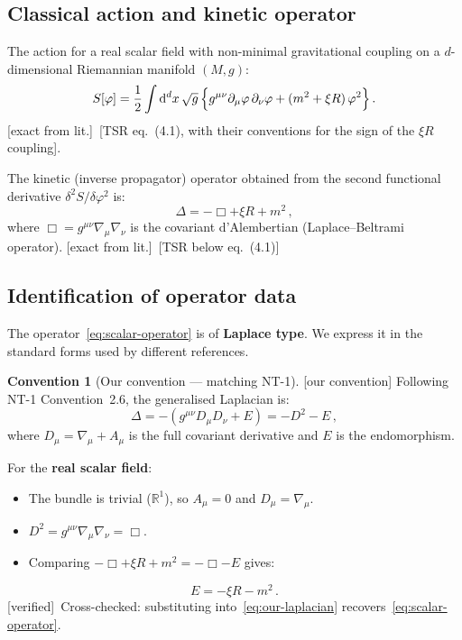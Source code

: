 \documentclass[12pt,a4paper]{article}
\theoremstyle{definition}
\newtheorem{convention}[proposition]{Convention}
\theoremstyle{remark}
\newcommand{\dd}{\mathrm{d}}
\newcommand{\fromlit}[1]{\textcolor{blue!70!black}{\textsf{[#1]}}}
\newcommand{\oursign}{\textcolor{teal!80!black}{\textsf{[our convention]}}}
\newcommand{\exactlit}{\textcolor{blue!60!black}{\textsf{[exact from lit.]}}}
\newcommand{\verified}{\textcolor{green!50!black}{\textsf{[verified]}}}
\begin{document}
\subsection{Classical action and kinetic operator}

The action for a real scalar field with non-minimal gravitational
coupling on a $d$-dimensional Riemannian manifold $(M,g)$:
\begin{equation}
  S[\varphi] = \frac{1}{2}\int \dd^d x\,\sqrt{g}\,\Bigl\{
    g^{\mu\nu}\partial_\mu\varphi\,\partial_\nu\varphi
    + (m^2 + \xi R)\,\varphi^2
  \Bigr\}\,.
  \label{eq:scalar-action}
\end{equation}
\exactlit\ \fromlit{TSR eq.~(4.1), with their conventions for the
sign of the $\xi R$ coupling}.

The kinetic (inverse propagator) operator obtained from the second
functional derivative $\delta^2 S/\delta\varphi^2$ is:
\begin{equation}
  \boxed{
  \Delta = -\Box + \xi R + m^2\,,
  }
  \label{eq:scalar-operator}
\end{equation}
where $\Box = g^{\mu\nu}\nabla_\mu\nabla_\nu$ is the covariant
d'Alembertian (Laplace--Beltrami operator).
\exactlit\ \fromlit{TSR below eq.~(4.1)}

\subsection{Identification of operator data}
\label{sec:operator-identification}

The operator~\eqref{eq:scalar-operator} is of \textbf{Laplace type}.
We express it in the standard forms used by different references.

\begin{convention}[Our convention --- matching NT-1]
\label{conv:ours}
\oursign\;
Following NT-1 Convention~2.6, the generalised Laplacian is:
\begin{equation}
  \Delta = -(g^{\mu\nu}D_\mu D_\nu + E) = -D^2 - E\,,
  \label{eq:our-laplacian}
\end{equation}
where $D_\mu = \nabla_\mu + A_\mu$ is the full covariant derivative
and $E$ is the endomorphism.

For the \textbf{real scalar field}:
\begin{itemize}[nosep]
\item The bundle is trivial ($\mathbb{R}^1$), so $A_\mu = 0$ and
  $D_\mu = \nabla_\mu$.
\item $D^2 = g^{\mu\nu}\nabla_\mu\nabla_\nu = \Box$.
\item Comparing $-\Box + \xi R + m^2 = -\Box - E$ gives:
\end{itemize}
\begin{equation}
  \boxed{
  E = -\xi R - m^2\,.
  }
  \label{eq:E-scalar}
\end{equation}
\verified\ Cross-checked: substituting into~\eqref{eq:our-laplacian}
recovers~\eqref{eq:scalar-operator}.
\end{convention}
\end{document}
